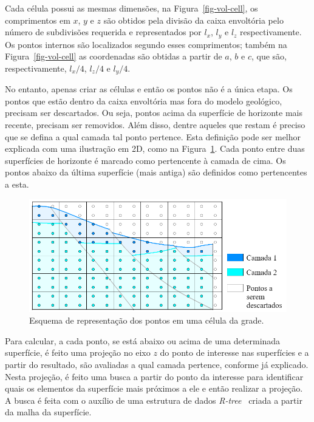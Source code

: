 Cada célula possui as mesmas dimensões, na Figura~\ref{fig-vol-cell}, os comprimentos em $x$, $y$ e $z$ são obtidos pela divisão da caixa envoltória pelo número de subdivisões requerida e representados por $l_x$, $l_y$ e $l_z$ respectivamente. Os pontos internos são localizados segundo esses comprimentos; também na Figura~\ref{fig-vol-cell} as coordenadas são obtidas a partir de $a$, $b$ e $c$, que são, respectivamente, $l_x/4$, $l_z/4$ e $l_y/4$.

No entanto, apenas criar as células e então os pontos não é a única etapa. Os pontos que estão dentro da caixa envoltória mas fora do modelo geológico, precisam ser descartados. Ou seja, pontos acima da superfície de horizonte mais recente, precisam ser removidos. Além disso, dentre aqueles que restam é preciso que se defina a qual camada tal ponto pertence. Esta definição pode ser melhor explicada com uma ilustração em 2D, como na Figura~\ref{fig-vol-2d}. Cada ponto entre duas superfícies de horizonte é marcado como pertencente à camada de cima. Os pontos abaixo da última superfície (mais antiga) são definidos como pertencentes a esta.

\begin{figure} [H]
  \begin{center}
    \includegraphics[width=\textwidth]{images/fig-vol-2d}
    \caption{Esquema de representação dos pontos em uma célula da grade.}\label{fig-vol-2d}
  \end{center}
\end{figure}

Para calcular, a cada ponto, se está abaixo ou acima de uma determinada superfície, é feito uma projeção no eixo $z$ do ponto de interesse nas superfícies e a partir do resultado, são avaliadas a qual camada pertence, conforme já explicado. Nesta projeção, é feito uma busca a partir do ponto da interesse para identificar quais os elementos da superfície mais próximos a ele e então realizar a projeção. A busca é feita com o auxílio de uma estrutura de dados \emph{R-tree}~\cite{RTree} criada a partir da malha da superfície.

